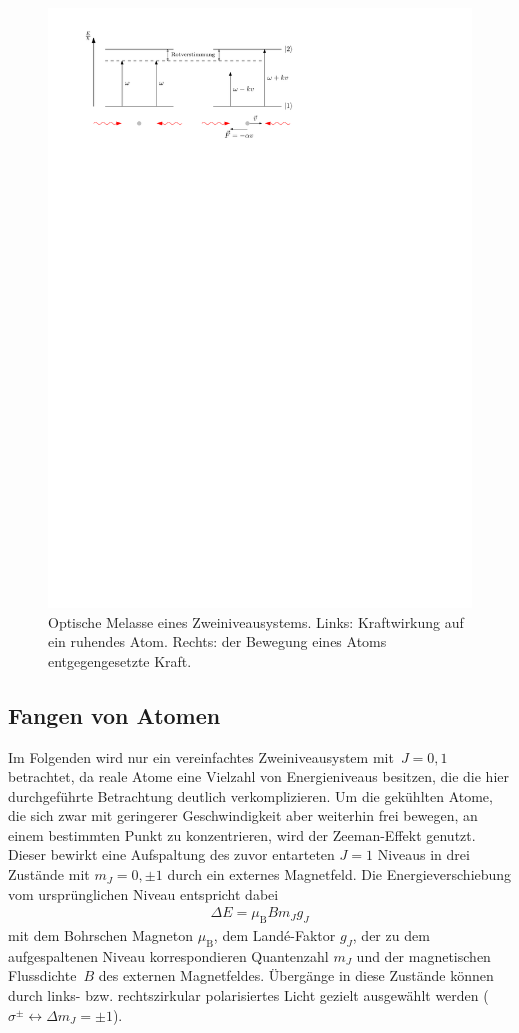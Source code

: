 \documentclass[11pt, a4paper]{article}
\numberwithin{equation}{section}
\begin{document}
\begin{figure}[h]
	\centering
	\includegraphics[width=.8\textwidth]{./figures/theory/melasse}
	\caption{Optische Melasse eines Zweiniveausystems. Links: Kraftwirkung auf ein ruhendes Atom. Rechts: der Bewegung eines Atoms entgegengesetzte Kraft.}
	\label{fig:opt_melasse}
\end{figure}

\subsection{Fangen von Atomen}
Im Folgenden wird nur ein vereinfachtes Zweiniveausystem mit~$J = 0, 1$ betrachtet, da reale Atome eine Vielzahl von Energieniveaus besitzen, die die hier durchgeführte Betrachtung deutlich verkomplizieren.
Um die gekühlten Atome, die sich zwar mit geringerer Geschwindigkeit aber weiterhin frei bewegen, an einem bestimmten Punkt zu konzentrieren, wird der Zeeman-Effekt genutzt.
Dieser bewirkt eine Aufspaltung des zuvor entarteten $J=1$ Niveaus in drei Zustände mit $m_J = 0, \pm1$ durch ein externes Magnetfeld.
Die Energieverschiebung vom ursprünglichen Niveau entspricht dabei
\begin{align*}
	\Delta E =\mu_\mathrm{B} B m_J g_J
\end{align*}
mit dem Bohrschen Magneton $\mu_\mathrm{B}$, dem Landé-Faktor $g_J$, der zu dem aufgespaltenen Niveau korrespondieren Quantenzahl $m_J$ und der magnetischen Flussdichte~$B$ des externen Magnetfeldes.
Übergänge in diese Zustände können durch links- bzw. rechtszirkular polarisiertes Licht gezielt ausgewählt werden ($\sigma^\pm \leftrightarrow \Delta m_J = \pm 1$).
\end{document}
